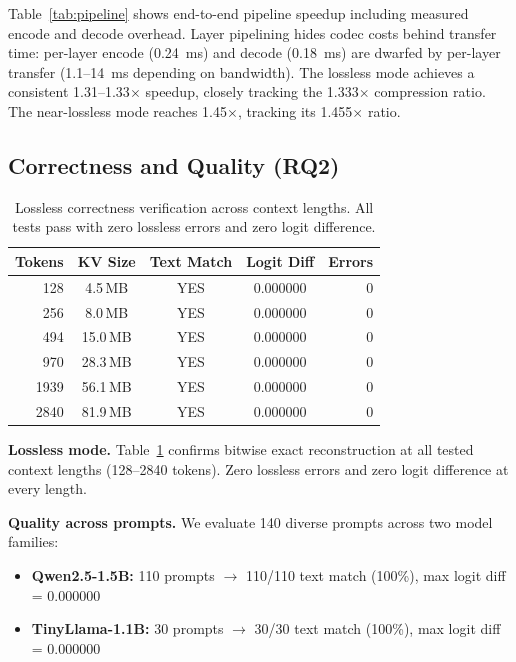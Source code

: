 Table~\ref{tab:pipeline} shows end-to-end pipeline speedup including measured encode and decode overhead. Layer pipelining hides codec costs behind transfer time: per-layer encode (0.24~ms) and decode (0.18~ms) are dwarfed by per-layer transfer (1.1--14~ms depending on bandwidth). The lossless mode achieves a consistent 1.31--1.33$\times$ speedup, closely tracking the 1.333$\times$ compression ratio. The near-lossless mode reaches 1.45$\times$, tracking its 1.455$\times$ ratio.

\subsection{Correctness and Quality (RQ2)}

\begin{table}[t]
\centering
\small
\caption{Lossless correctness verification across context lengths. All tests pass with zero lossless errors and zero logit difference.}
\label{tab:correctness}
\begin{tabular}{rcccr}
\toprule
Tokens & KV Size & Text Match & Logit Diff & Errors \\
\midrule
128 & 4.5\,MB & YES & 0.000000 & 0 \\
256 & 8.0\,MB & YES & 0.000000 & 0 \\
494 & 15.0\,MB & YES & 0.000000 & 0 \\
970 & 28.3\,MB & YES & 0.000000 & 0 \\
1939 & 56.1\,MB & YES & 0.000000 & 0 \\
2840 & 81.9\,MB & YES & 0.000000 & 0 \\
\bottomrule
\end{tabular}
\end{table}

\textbf{Lossless mode.} Table~\ref{tab:correctness} confirms bitwise exact reconstruction at all tested context lengths (128--2840 tokens). Zero lossless errors and zero logit difference at every length.

\textbf{Quality across prompts.} We evaluate 140 diverse prompts across two model families:
\begin{itemize}[nosep,leftmargin=*]
\item \textbf{Qwen2.5-1.5B:} 110 prompts $\to$ 110/110 text match (100\%), max logit diff = 0.000000
\item \textbf{TinyLlama-1.1B:} 30 prompts $\to$ 30/30 text match (100\%), max logit diff = 0.000000
\end{itemize}

